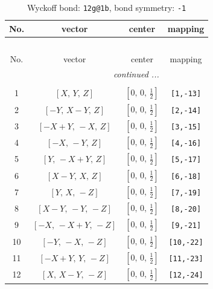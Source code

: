 \documentclass[fleqn,8pt]{jsarticle}
\begin{document}
\begin{longtable}{cccc}
\caption{Wyckoff bond: {\tt 12g@1b}, bond symmetry: {\tt -1}}
 \\
 \hline \hline
No. & vector & center & mapping \\ \hline \endfirsthead

\multicolumn{3}{l}{\tablename\ \thetable{}} \\
 \hline \hline
No. & vector & center & mapping \\ \hline \endhead

 \hline \hline
\multicolumn{3}{r}{\footnotesize\it continued ...} \\ \endfoot

 \hline \hline
\multicolumn{3}{r}{} \\ \endlastfoot

1 & $\left[ X,\, Y,\, Z \right]$ & $\left[ 0,\, 0,\, \frac{1}{2} \right]$ & {\tt [1,-13]} \\ \hline
2 & $\left[ - Y,\, X - Y,\, Z \right]$ & $\left[ 0,\, 0,\, \frac{1}{2} \right]$ & {\tt [2,-14]} \\ \hline
3 & $\left[ - X + Y,\, - X,\, Z \right]$ & $\left[ 0,\, 0,\, \frac{1}{2} \right]$ & {\tt [3,-15]} \\ \hline
4 & $\left[ - X,\, - Y,\, Z \right]$ & $\left[ 0,\, 0,\, \frac{1}{2} \right]$ & {\tt [4,-16]} \\ \hline
5 & $\left[ Y,\, - X + Y,\, Z \right]$ & $\left[ 0,\, 0,\, \frac{1}{2} \right]$ & {\tt [5,-17]} \\ \hline
6 & $\left[ X - Y,\, X,\, Z \right]$ & $\left[ 0,\, 0,\, \frac{1}{2} \right]$ & {\tt [6,-18]} \\ \hline
7 & $\left[ Y,\, X,\, - Z \right]$ & $\left[ 0,\, 0,\, \frac{1}{2} \right]$ & {\tt [7,-19]} \\ \hline
8 & $\left[ X - Y,\, - Y,\, - Z \right]$ & $\left[ 0,\, 0,\, \frac{1}{2} \right]$ & {\tt [8,-20]} \\ \hline
9 & $\left[ - X,\, - X + Y,\, - Z \right]$ & $\left[ 0,\, 0,\, \frac{1}{2} \right]$ & {\tt [9,-21]} \\ \hline
10 & $\left[ - Y,\, - X,\, - Z \right]$ & $\left[ 0,\, 0,\, \frac{1}{2} \right]$ & {\tt [10,-22]} \\ \hline
11 & $\left[ - X + Y,\, Y,\, - Z \right]$ & $\left[ 0,\, 0,\, \frac{1}{2} \right]$ & {\tt [11,-23]} \\ \hline
12 & $\left[ X,\, X - Y,\, - Z \right]$ & $\left[ 0,\, 0,\, \frac{1}{2} \right]$ & {\tt [12,-24]} \\
\end{longtable}
\end{document}
